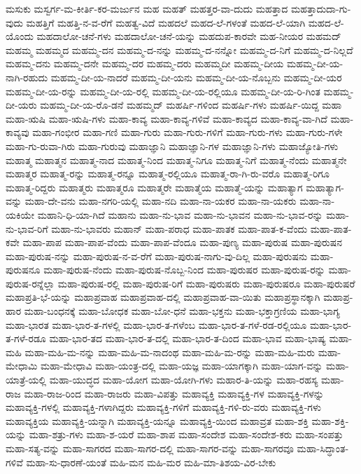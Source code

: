 {ಮಸುಕು
ಮಸ್ವರ್ಗ-ಮ-ಕೀರ್ತಿ-ಕರ-ಮರ್ಜುನ
ಮಹ
ಮಹತ್
ಮಹತ್ತರ-ವಾ-ದುದು
ಮಹತ್ತಾದ
ಮಹತ್ತಾದುದಾ-ಗು-ವುದು
ಮಹತ್ತಿಗೆ
ಮಹತ್ತಿ-ನ-ವ-ರೆಗೆ
ಮಹತ್ವ-ವಿದೆ
ಮಹದಲೆ
ಮಹದ-ಲೆ-ಗಳಂತೆ
ಮಹದ-ಲೆ-ಯಾಗಿ
ಮಹದ-ಲೆ-ಯೊಂದು
ಮಹದಾಲೋ-ಚನೆ-ಗಳು
ಮಹದಾಲೋ-ಚನೆ-ಯನ್ನು
ಮಹದುಪ-ಕಾರವೇ
ಮಹ-ನೀಯರ
ಮಹಮದ್
ಮಹಮ್ಮ
ಮಹಮ್ಮದ
ಮಹಮ್ಮ-ದನ
ಮಹಮ್ಮ-ದ-ನನ್ನು
ಮಹಮ್ಮ-ದ-ನನ್ನೋ
ಮಹಮ್ಮ-ದ-ನಿಗೆ
ಮಹಮ್ಮ-ದ-ನಿಲ್ಲದೆ
ಮಹಮ್ಮ-ದನು
ಮಹಮ್ಮ-ದನೇ
ಮಹಮ್ಮ-ದರ
ಮಹಮ್ಮ-ದರು
ಮಹಮ್ಮದೀ
ಮಹಮ್ಮ-ದೀಯ
ಮಹಮ್ಮ-ದೀ-ಯ-ನಾಗಿ-ರಹುದು
ಮಹಮ್ಮ-ದೀ-ಯ-ನಾದರೆ
ಮಹಮ್ಮ-ದೀ-ಯನು
ಮಹಮ್ಮ-ದೀ-ಯ-ನೊಬ್ಬನು
ಮಹಮ್ಮ-ದೀ-ಯರ
ಮಹಮ್ಮ-ದೀ-ಯ-ರನ್ನು
ಮಹಮ್ಮ-ದೀ-ಯ-ರಲ್ಲಿ
ಮಹಮ್ಮ-ದೀ-ಯ-ರಲ್ಲಿಯೂ
ಮಹಮ್ಮ-ದೀ-ಯ-ರಿ-ಗಿಂತ
ಮಹಮ್ಮ-ದೀ-ಯರು
ಮಹಮ್ಮ-ದೀ-ಯ-ರೊ-ಡನೆ
ಮಹಮ್ಮದ್
ಮಹರ್ಷಿ-ಗಳಿಂದ
ಮಹರ್ಷಿ-ಗಳು
ಮಹರ್ಷಿ-ಯಿದ್ದ
ಮಹಾ
ಮಹಾ-ಋಷಿ
ಮಹಾ-ಋಷಿ-ಗಳು
ಮಹಾ-ಕಾವ್ಯ
ಮಹಾ-ಕಾವ್ಯ-ಗಳಿವೆ
ಮಹಾ-ಕಾವ್ಯದ
ಮಹಾ-ಕಾವ್ಯ-ವಾ-ಗಿದೆ
ಮಹಾ-ಕಾವ್ಯವು
ಮಹಾ-ಗಂಭೀರ
ಮಹಾ-ಗಣಿ
ಮಹಾ-ಗುರು
ಮಹಾ-ಗುರು-ಗಳಿಗೆ
ಮಹಾ-ಗುರು-ಗಳು
ಮಹಾ-ಗುರು-ಗಳೇ
ಮಹಾ-ಗು-ರುವಾ-ಗಿರು
ಮಹಾ-ಗುರುವು
ಮಹಾಜ್ಞಾನಿ
ಮಹಾಜ್ಞಾನಿ-ಗಳ
ಮಹಾಜ್ಞಾನಿ-ಗಳು
ಮಹಾಜ್ಯೋತಿ-ಗಳು
ಮಹಾತ್ಮ
ಮಹಾತ್ಮನ
ಮಹಾತ್ಮ-ನಾದ
ಮಹಾತ್ಮ-ನಿಂದ
ಮಹಾತ್ಮ-ನಿಗೂ
ಮಹಾತ್ಮ-ನಿಗೆ
ಮಹಾತ್ಮ-ನೆಂದು
ಮಹಾತ್ಮನೇ
ಮಹಾತ್ಮರ
ಮಹಾತ್ಮ-ರನ್ನು
ಮಹಾತ್ಮ-ರನ್ನೂ
ಮಹಾತ್ಮ-ರಲ್ಲಿಯೂ
ಮಹಾತ್ಮ-ರಾ-ಗಿ-ರು-ವರೊ
ಮಹಾತ್ಮ-ರಿಗೂ
ಮಹಾತ್ಮ-ರಿದ್ದರು
ಮಹಾತ್ಮರು
ಮಹಾತ್ಮರೂ
ಮಹಾತ್ಮರೇ
ಮಹಾತ್ಮೆಯ
ಮಹಾತ್ಮೆ-ಯನ್ನು
ಮಹಾತ್ಯಾಗ
ಮಹಾತ್ಯಾಗ-ವನ್ನು
ಮಹಾ-ದೇ-ವನು
ಮಹಾ-ನಗರಿ-ಯಲ್ಲಿ
ಮಹಾ-ನದಿ
ಮಹಾ-ನಾ-ಯಕರ
ಮಹಾ-ನಾ-ಯಕರು
ಮಹಾ-ನಾ-ಯಕಿಯೇ
ಮಹಾನಿ-ಧಿ-ಯಾ-ಗಿದೆ
ಮಹಾನು
ಮಹಾ-ನು-ಭಾವ
ಮಹಾ-ನು-ಭಾವನ
ಮಹಾ-ನು-ಭಾವ-ರನ್ನು
ಮಹಾ-ನು-ಭಾವ-ರಿಗೆ
ಮಹಾ-ನು-ಭಾವರು
ಮಹಾನ್
ಮಹಾ-ಪರಾಧ
ಮಹಾ-ಪಾತಕ
ಮಹಾ-ಪಾತ-ಕ-ವೆಂದು
ಮಹಾ-ಪಾತ-ಕವೇ
ಮಹಾ-ಪಾಪ
ಮಹಾ-ಪಾಪ-ವೆಂದು
ಮಹಾ-ಪಾಪ-ವೆಂದೂ
ಮಹಾ-ಪುಣ್ಯ
ಮಹಾ-ಪುರುಷ
ಮಹಾ-ಪುರುಷನ
ಮಹಾ-ಪುರುಷ-ನನ್ನು
ಮಹಾ-ಪುರುಷ-ನ-ವ-ರೆಗೆ
ಮಹಾ-ಪುರುಷ-ನಾಗು-ವು-ದಿಲ್ಲ
ಮಹಾ-ಪುರುಷನು
ಮಹಾ-ಪುರುಷನೂ
ಮಹಾ-ಪುರುಷ-ನೆಂದು
ಮಹಾ-ಪುರುಷ-ನೊಬ್ಬ-ನಿಂದ
ಮಹಾ-ಪುರುಷರ
ಮಹಾ-ಪುರುಷ-ರನ್ನು
ಮಹಾ-ಪುರುಷ-ರನ್ನೆಲ್ಲಾ
ಮಹಾ-ಪುರುಷ-ರಲ್ಲಿ
ಮಹಾ-ಪುರುಷ-ರಿಗೆ
ಮಹಾ-ಪುರುಷರು
ಮಹಾ-ಪುರುಷರೂ
ಮಹಾ-ಪುರುಷರೆ
ಮಹಾಪ್ರತಿ-ಭೆ-ಯನ್ನು
ಮಹಾಪ್ರವಾಹ
ಮಹಾಪ್ರವಾಹ-ದಲ್ಲಿ
ಮಹಾಪ್ರವಾಹ-ವಾ-ಯಿತು
ಮಹಾಪ್ರಸ್ಥಾನಕ್ಕಾಗಿ
ಮಹಾಪ್ರ-ಹಾರ
ಮಹಾ-ಬಂಧನಕ್ಕೆ
ಮಹಾ-ಬೋಧಕ
ಮಹಾ-ಬೋ-ಧನೆ
ಮಹಾ-ಭಕ್ತನು
ಮಹಾ-ಭಕ್ತಾಗ್ರಣಿಯ
ಮಹಾ-ಭಾಗ್ಯ
ಮಹಾ-ಭಾರತ
ಮಹಾ-ಭಾರ-ತ-ಗಳಲ್ಲಿ
ಮಹಾ-ಭಾರ-ತ-ಗಳೆಂಬ
ಮಹಾ-ಭಾರ-ತ-ಗಳೆ-ರಡ-ರಲ್ಲಿಯೂ
ಮಹಾ-ಭಾರ-ತ-ಗಳೆ-ರಡೂ
ಮಹಾ-ಭಾರ-ತದ
ಮಹಾ-ಭಾರ-ತ-ದಲ್ಲಿ
ಮಹಾ-ಭಾರ-ತ-ದಿಂದ
ಮಹಾ-ಭಾವ
ಮಹಾ-ಭಾಷ್ಯ
ಮಹಾ-ಮಹಿ
ಮಹಾ-ಮಹಿ-ಮ-ನನ್ನು
ಮಹಾ-ಮಹಿ-ಮ-ನಾದಂಥ
ಮಹಾ-ಮಹಿ-ಮ-ರನ್ನು
ಮಹಾ-ಮಹಿ-ಮರು
ಮಹಾ-ಮೇಧಾಮಿ
ಮಹಾ-ಮೇಧಾವಿ
ಮಹಾ-ಯಂತ್ರ-ದಲ್ಲಿ
ಮಹಾ-ಯಜ್ಞ
ಮಹಾ-ಯಾಗಕ್ಕಾಗಿ
ಮಹಾ-ಯಾಗ-ವನ್ನು
ಮಹಾ-ಯಾತ್ರೆ-ಯಲ್ಲಿ
ಮಹಾ-ಯುದ್ಧದ
ಮಹಾ-ಯೋಗ
ಮಹಾ-ಯೋಗಿ-ಗಳು
ಮಹಾರ-ತಿ-ಯನ್ನು
ಮಹಾ-ರಹಸ್ಯ
ಮಹಾ-ರಾಜ
ಮಹಾ-ರಾಜ-ರಿಂದ
ಮಹಾ-ರಾಜರು
ಮಹಾ-ವಿಪತ್ತು
ಮಹಾವ್ಯಕ್ತಿ
ಮಹಾವ್ಯಕ್ತಿ-ಗಳ
ಮಹಾವ್ಯಕ್ತಿ-ಗಳನ್ನು
ಮಹಾವ್ಯಕ್ತಿ-ಗಳಲ್ಲಿ
ಮಹಾವ್ಯಕ್ತಿ-ಗಳಾಗಿದ್ದರು
ಮಹಾವ್ಯಕ್ತಿ-ಗಳಿಗೆ
ಮಹಾವ್ಯಕ್ತಿ-ಗಳಿ-ರು-ವರು
ಮಹಾವ್ಯಕ್ತಿ-ಗಳು
ಮಹಾವ್ಯಕ್ತಿಯ
ಮಹಾವ್ಯಕ್ತಿ-ಯನ್ನಾಗಿ
ಮಹಾವ್ಯಕ್ತಿ-ಯನ್ನೂ
ಮಹಾವ್ಯಕ್ತಿ-ಯಿಂದ
ಮಹಾವ್ರತ
ಮಹಾ-ಶಕ್ತಿ
ಮಹಾ-ಶಕ್ತಿ-ಯನ್ನು
ಮಹಾ-ಶತ್ರು-ಗಳು
ಮಹಾ-ಶ-ಯರೆ
ಮಹಾ-ಶಾಪ
ಮಹಾ-ಸಂದೇಶ
ಮಹಾ-ಸಂದೇಶ-ಕರು
ಮಹಾ-ಸಂಪತ್ತು
ಮಹಾ-ಸತ್ಯ-ವನ್ನು
ಮಹಾ-ಸಾಗರದ
ಮಹಾ-ಸಾಗರ-ದಲ್ಲಿ
ಮಹಾ-ಸಾಗರ-ವನ್ನು
ಮಹಾ-ಸಾಗರವೂ
ಮಹಾ-ಸಿದ್ಧಾಂತ-ಗಳಿವೆ
ಮಹಾ-ಸು-ಧಾರಣೆ-ಯಂತೆ
ಮಹಿ-ಮನ
ಮಹಿ-ಮರ
ಮಹಿ-ಮಾ-ತಿಶಯ-ವಿರ-ಬೇಕು
}
